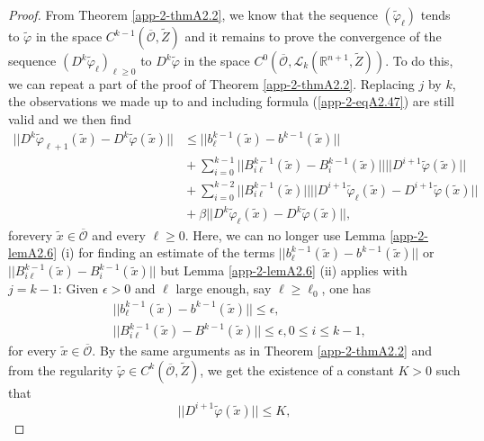 \begin{proof}
From Theorem \ref{app-2-thmA2.2}, we know that the sequence
$(\widetilde{\varphi}_{\ell})$ tends to $\widetilde{\varphi}$ in the
space $C^{k-1}(\overline{\mathscr{O}}, \widetilde{Z})$ and it remains
to prove the convergence of the  sequence
$(D^{k}\widetilde{\varphi}_{\ell})_{\ell \geq 0}$ to
$D^{k}\widetilde{\varphi}$ in the space $C^{0}(\overline{\mathscr{O}},
\mathscr{L}_{k}(\mathbb{R}^{n+1}, \widetilde{Z}))$. To do this, we can
repeat a part of the proof of Theorem \ref{app-2-thmA2.2}. Replacing $j$ by $k$, the
observations we made up to and including formula (\ref{app-2-eqA2.47}) are still
valid and we then find
\begin{align*}
||D^{k}\widetilde{\varphi}_{\ell + 1}(\widetilde{x})  -
D^{k}\widetilde{\varphi}(\widetilde{x})|| &\leq
||b_{\ell}^{k-1}(\widetilde{x}) - b^{k-1}(\widetilde{x})||\\ 
&{}+\sum\limits_{i=0}^{k-1} ||B_{i\ell}^{k-1} (\widetilde{x}) -
B_{i}^{k-1}(\widetilde{x})|| ||D^{i+1}
\widetilde{\varphi}(\widetilde{x})|| \tag{A2.51}\label{app-2-eqA2.51}\\
&{} + \sum\limits_{i=0}^{k-2} ||B_{i\ell}^{k-1}(\widetilde{x})||
||D^{i+1}\widetilde{\varphi}_{\ell} (\widetilde{x}) -
D^{i+1}\widetilde{\varphi}(\widetilde{x})||\\ 
&{}+ \beta||D^{k}\widetilde{\varphi}_{\ell} (\widetilde{x}) -
D^{k}\widetilde{\varphi}(\widetilde{x})||, 
\end{align*}
for\pageoriginale every $\widetilde{x} \in
\overline{\mathscr{O}}$ and every $\ell \geq 0$. Here, we can no
longer use Lemma \ref{app-2-lemA2.6} (i) for finding an estimate of the terms
$||b_{\ell}^{k-1} (\widetilde{x}) - b^{k-1}(\widetilde{x})||$ or
$||B_{i\ell}^{k-1} (\widetilde{x}) - B_{i}^{k-1}(\widetilde{x})||$ but
Lemma \ref{app-2-lemA2.6} (ii) applies with $j = k-1$: Given $\epsilon > 0$ and
$\ell$ large enough, say $\ell \geq \ell_{0}$, one has
\begin{align*}
& ||b_{\ell}^{k-1}(\widetilde{x}) - b^{k-1}(\widetilde{x})|| \leq
\epsilon,\\
& ||B_{i\ell}^{k-1} (\widetilde{x}) - B^{k-1}(\widetilde{x})|| \leq
\epsilon, 0 \leq i \leq k-1,
\end{align*}
for every $\widetilde{x} \in \overline{\mathscr{O}}$. By the same
arguments as in Theorem \ref{app-2-thmA2.2} and from the regularity
$\widetilde{\varphi} \in C^{k}(\overline{\mathscr{O}},
\widetilde{Z})$, we get the existence of a constant $K > 0$ such that
$$
||D^{i+1}\widetilde{\varphi}(\widetilde{x})|| \leq K,
$$
\end{proof}
